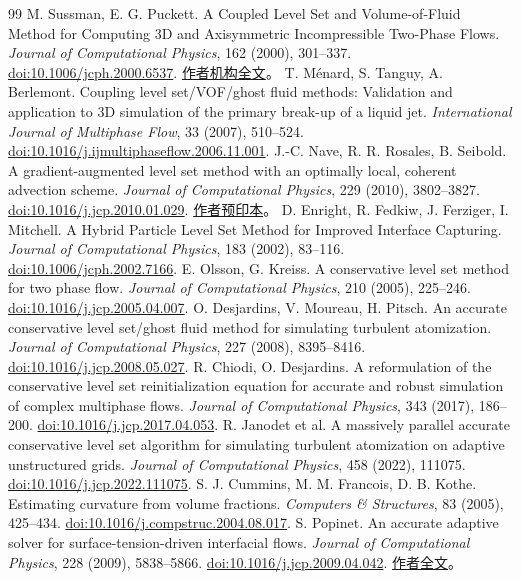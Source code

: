 \documentclass[11pt,a4paper]{article}
\newcommand{\doi}[1]{\href{https://doi.org/#1}{doi:#1}}
\begin{document}
\clearpage
{}
{}
\begin{thebibliography}{99}
 M. Sussman, E. G. Puckett. A Coupled Level Set and Volume-of-Fluid Method for Computing 3D and Axisymmetric Incompressible Two-Phase Flows. \emph{Journal of Computational Physics}, 162 (2000), 301--337. \doi{10.1006/jcph.2000.6537}. \href{https://www.math.ucdavis.edu/~egp/PUBLICATIONS/JOURNAL_ARTICLES/APPEARED/2000/MSS-EGP_2000.pdf}{作者机构全文}。
 T. Ménard, S. Tanguy, A. Berlemont. Coupling level set/VOF/ghost fluid methods: Validation and application to 3D simulation of the primary break-up of a liquid jet. \emph{International Journal of Multiphase Flow}, 33 (2007), 510--524. \doi{10.1016/j.ijmultiphaseflow.2006.11.001}.
 J.-C. Nave, R. R. Rosales, B. Seibold. A gradient-augmented level set method with an optimally local, coherent advection scheme. \emph{Journal of Computational Physics}, 229 (2010), 3802--3827. \doi{10.1016/j.jcp.2010.01.029}. \href{https://arxiv.org/abs/0905.3409}{作者预印本}。
 D. Enright, R. Fedkiw, J. Ferziger, I. Mitchell. A Hybrid Particle Level Set Method for Improved Interface Capturing. \emph{Journal of Computational Physics}, 183 (2002), 83--116. \doi{10.1006/jcph.2002.7166}.
 E. Olsson, G. Kreiss. A conservative level set method for two phase flow. \emph{Journal of Computational Physics}, 210 (2005), 225--246. \doi{10.1016/j.jcp.2005.04.007}.
 O. Desjardins, V. Moureau, H. Pitsch. An accurate conservative level set/ghost fluid method for simulating turbulent atomization. \emph{Journal of Computational Physics}, 227 (2008), 8395--8416. \doi{10.1016/j.jcp.2008.05.027}.
 R. Chiodi, O. Desjardins. A reformulation of the conservative level set reinitialization equation for accurate and robust simulation of complex multiphase flows. \emph{Journal of Computational Physics}, 343 (2017), 186--200. \doi{10.1016/j.jcp.2017.04.053}.
 R. Janodet et al. A massively parallel accurate conservative level set algorithm for simulating turbulent atomization on adaptive unstructured grids. \emph{Journal of Computational Physics}, 458 (2022), 111075. \doi{10.1016/j.jcp.2022.111075}.
 S. J. Cummins, M. M. Francois, D. B. Kothe. Estimating curvature from volume fractions. \emph{Computers \& Structures}, 83 (2005), 425--434. \doi{10.1016/j.compstruc.2004.08.017}.
 S. Popinet. An accurate adaptive solver for surface-tension-driven interfacial flows. \emph{Journal of Computational Physics}, 228 (2009), 5838--5866. \doi{10.1016/j.jcp.2009.04.042}. \href{https://gerris.dalembert.upmc.fr/papers/tension.pdf}{作者全文}。

\end{thebibliography}
\end{document}

